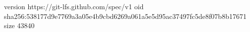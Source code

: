 version https://git-lfs.github.com/spec/v1
oid sha256:538177d9e7769a3a05e4b9cbd6269a061a5e5d95ac37497fc5de8f07b8b17671
size 43840
